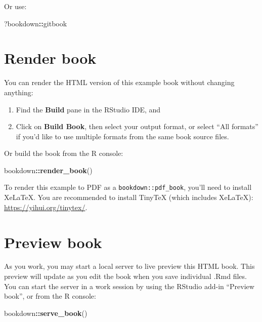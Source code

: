 \documentclass[
]{book}
\newenvironment{Shaded}{\begin{snugshade}}{\end{snugshade}}
\newcommand{\FunctionTok}[1]{\textcolor[rgb]{0.13,0.29,0.53}{\textbf{#1}}}
\newcommand{\NormalTok}[1]{#1}
\newcommand{\SpecialCharTok}[1]{\textcolor[rgb]{0.81,0.36,0.00}{\textbf{#1}}}
\theoremstyle{definition}
\theoremstyle{definition}
\theoremstyle{definition}
\theoremstyle{definition}
\theoremstyle{remark}
\begin{document}
Or use:

\begin{Shaded}
\begin{Highlighting}[]
\NormalTok{?bookdown}\SpecialCharTok{::}\NormalTok{gitbook}
\end{Highlighting}
\end{Shaded}

\hypertarget{render-book}{%
\section{Render book}\label{render-book}}

You can render the HTML version of this example book without changing anything:

\begin{enumerate}
\def\labelenumi{\arabic{enumi}.}
\item
  Find the \textbf{Build} pane in the RStudio IDE, and
\item
  Click on \textbf{Build Book}, then select your output format, or select ``All formats'' if you'd like to use multiple formats from the same book source files.
\end{enumerate}

Or build the book from the R console:

\begin{Shaded}
\begin{Highlighting}[]
\NormalTok{bookdown}\SpecialCharTok{::}\FunctionTok{render\_book}\NormalTok{()}
\end{Highlighting}
\end{Shaded}

To render this example to PDF as a \texttt{bookdown::pdf\_book}, you'll need to install XeLaTeX. You are recommended to install TinyTeX (which includes XeLaTeX): \url{https://yihui.org/tinytex/}.

\hypertarget{preview-book}{%
\section{Preview book}\label{preview-book}}

As you work, you may start a local server to live preview this HTML book. This preview will update as you edit the book when you save individual .Rmd files. You can start the server in a work session by using the RStudio add-in ``Preview book'', or from the R console:

\begin{Shaded}
\begin{Highlighting}[]
\NormalTok{bookdown}\SpecialCharTok{::}\FunctionTok{serve\_book}\NormalTok{()}
\end{Highlighting}
\end{Shaded}
\end{document}
